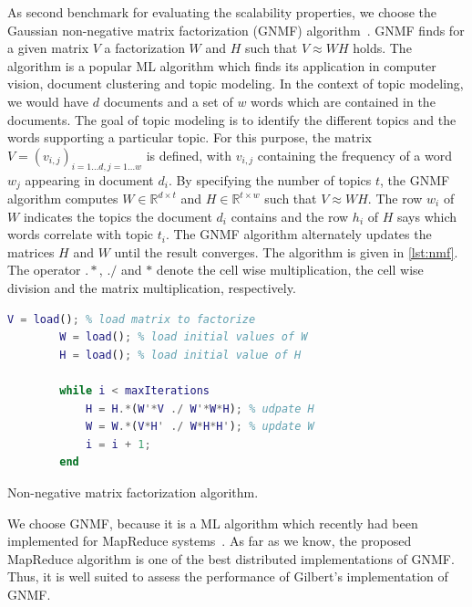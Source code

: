 As second benchmark for evaluating the scalability properties, we choose the Gaussian non-negative matrix factorization (GNMF) algorithm~\cite{seung:anips2001a}.
GNMF finds for a given matrix $V$ a factorization $W$ and $H$ such that $V\approx W H$ holds.
The algorithm is a popular ML algorithm which finds its application in computer vision, document clustering and topic modeling.
In the context of topic modeling, we would have $d$ documents and a set of $w$ words which are contained in the documents.
The goal of topic modeling is to identify the different topics and the words supporting a particular topic.
For this purpose, the matrix $V = (v_{i,j})_{i=1\ldots d,j=1\ldots w}$ is defined, with $v_{i,j}$ containing the frequency of a word $w_j$ appearing in document $d_i$.
By specifying the number of topics $t$, the GNMF algorithm computes $W\in \mathbb{R}^{d\times t}$ and $H\in \mathbb{R}^{t\times w}$ such that $V \approx W H$.
The row $w_i$ of $W$ indicates the topics the document $d_i$ contains and the row $h_i$ of $H$ says which words correlate with topic $t_i$.
The GNMF algorithm alternately updates the matrices $H$ and $W$ until the result converges.
The algorithm is given in \cref{lst:nmf}.
The operator $.*$, $./$ and $*$ denote the cell wise multiplication, the cell wise division and the matrix multiplication, respectively.

\begin{listing}[!h]
	\begin{CenteredBox}
		\begin{lstlisting}[language=Matlab,
			commentstyle=\color{black},
		  stringstyle=\color{black},
		  keywordstyle=\color{black}\bfseries,
		]
		V = load(); % load matrix to factorize
		W = load(); % load initial values of W
		H = load(); % load initial value of H

		while i < maxIterations
			H = H.*(W'*V ./ W'*W*H); % udpate H
			W = W.*(V*H' ./ W*H*H'); % update W
			i = i + 1;
		end
		\end{lstlisting}
	\end{CenteredBox}
	\caption{Non-negative matrix factorization algorithm.}
	\label{lst:nmf}
\end{listing}

We choose GNMF, because it is a ML algorithm which recently had been implemented for MapReduce systems~\cite{liu:2010a}.
As far as we know, the proposed MapReduce algorithm is one of the best distributed implementations of GNMF.
Thus, it is well suited to assess the performance of Gilbert's implementation of GNMF.

